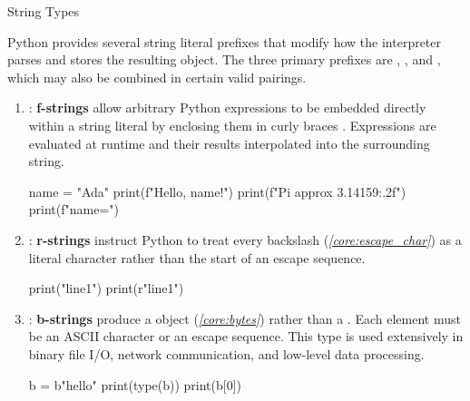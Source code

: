 \documentclass[10pt]{article}
\begin{document}
      \begin{core}{String Types}

        Python provides several string literal prefixes that modify how the interpreter parses and stores the resulting object. The three primary prefixes are , , and , which may also be combined in certain valid pairings.

        \begin{enumerate}

          \item {}: \textbf{f-strings} allow arbitrary Python expressions to be embedded directly within a string literal by enclosing them in curly braces \textcode{\{\}}. Expressions are evaluated at runtime and their results interpolated into the surrounding string.

          \begin{pyconsole}

            name = "Ada"
            print(f"Hello, {name}!")
            print(f"Pi approx {3.14159:.2f}")
            print(f"{name=}")

          \end{pyconsole}

          \item {}: \textbf{r-strings} instruct Python to treat every backslash (\textit{\autoref{core:escape_char}}) as a literal character rather than the start of an escape sequence.

          \begin{pyconsole}

            print("line1")
            print(r"line1")

          \end{pyconsole}

          \item {}: \textbf{b-strings} produce a  object (\textit{\autoref{core:bytes}}) rather than a . Each element must be an ASCII character or an escape sequence. This type is used extensively in binary file I/O, network communication, and low-level data processing.

          \begin{pyconsole}

            b = b"hello"
            print(type(b))
            print(b[0])


\end{pyconsole}
\end{enumerate}
\end{core}
\end{document}
